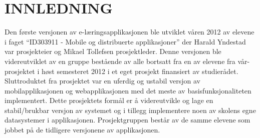 \documentclass[../main.tex]{subfiles}
\begin{document}
\section{INNLEDNING}

Den første versjonen av e-læringsapplikasjonen ble utviklet våren 2012 av elevene i faget “ID303911 - Mobile og distribuerte applikasjoner” der Harald Yndestad var prosjekteier og Mikael Tollefsen prosjektleder. Denne versjonen ble videreutviklet av en gruppe bestående av alle bortsatt fra en av elevene fra vår-prosjektet i høst semesteret 2012 i et eget prosjekt finansiert av studierådet.\newline
\newline
Sluttroduktet fra prosjektet var en uferdig og ustabil versjon av mobilapplikasjonen og webapplikasjonen med det meste av basisfunksjonaliteten implementert. Dette prosjektets formål er å videreutvikle og lage en stabil/brukbar versjon av systemet og i tillegg implementere noen av skolens egne datasystemer i applikasjonen. Prosjektgruppen består av de samme elevene som jobbet på de tidligere versjonene av applikasjonen.

\newpage
\end{document}
